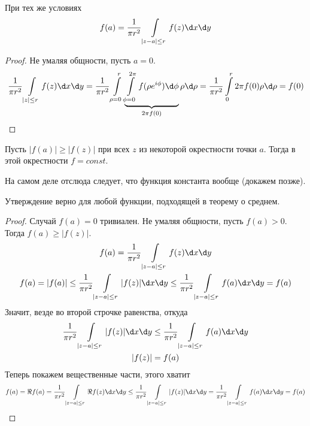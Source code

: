 \begin{conseq}
	При тех же условиях
	\[ f(a) = \frac1{\pi r^2}\int\limits_{|z - a| \le r} f(z) \d x \d y \]
\end{conseq}
\begin{proof}
	Не умаляя общности, пусть $a = 0$.
	\begin{gather*}
		\frac1{\pi r^2} \int\limits_{|z| \le r} f(z) \d x \d y
		= \frac1{\pi r^2} \int\limits_{\rho=0}^r \underbrace{\int\limits_{\phi=0}^{2\pi} f(\rho e^{i\phi}) \d \phi}_{2\pi f(0)} \rho \d \rho
		= \frac1{\pi r^2} \int\limits_0^r 2\pi f(0) \rho \d \rho
		= f(0)
	\end{gather*}
\end{proof}

\begin{theorem}
	Пусть $|f(a)| \ge |f(z)|$ при всех $z$ из некоторой окрестности точки $a$.
	Тогда в этой окрестности $f = const$.
\end{theorem}
\begin{Rem}
	На самом деле отслюда следует, что функция константа вообще (докажем позже).
\end{Rem}
\begin{Rem}
	Утверждение верно для любой функции, подходящей в теорему о среднем.
\end{Rem}
\begin{proof}
	Случай $f(a) = 0$ тривиален. Не умаляя общности, пусть $f(a) > 0$.
	Тогда $f(a) \ge |f(z)|$.
	\begin{gather*}
		f(a) = \frac1{\pi r^2} \int\limits_{|z - a| \le r} f(z) \d x \d y \\
		f(a) = |f(a)| \le \frac1{\pi r^2} \int\limits_{|z - a| \le r} |f(z)| \d x \d y
		\le \frac1{\pi r^2} \int\limits_{|z - a| \le r} f(a) \d x \d y
		= f(a)
	\end{gather*}
	Значит, везде во второй строчке равенства, откуда
	\begin{gather*}
		\frac1{\pi r^2} \int\limits_{|z - a| \le r} |f(z)| \d x \d y \le \frac1{\pi r^2} \int\limits_{|z - a| \le r} f(a) \d x \d y \\
		|f(z)| = f(a)
	\end{gather*}
	Теперь покажем вещественные части, этого хватит
	\begin{gather*}
		f(a) = \Re f(a)
		= \frac1{\pi r^2} \int\limits_{|z - a| \le r} \Re f(z) \d x \d y
		\le \frac1{\pi r^2} \int\limits_{|z - a| \le r} |f(z)| \d x \d y
		= \frac1{\pi r^2} \int\limits_{|z - a| \le r} f(a) \d x \d y = f(a)
	\end{gather*}
\end{proof}


